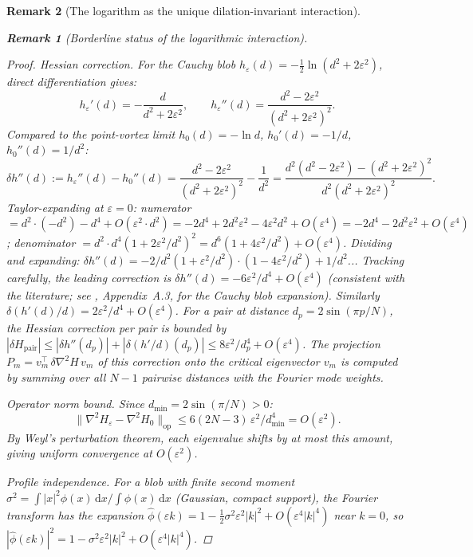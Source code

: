 \documentclass[12pt, a4paper]{article}
\newtheorem{remark}{Remark}[section]
\numberwithin{equation}{section}
\newcommand{\dd}{\mathrm{d}}
\begin{document}
\begin{remark}[The logarithm as the unique dilation-invariant interaction]
\begin{remark}[Borderline status of the logarithmic interaction]
\begin{proof}
\emph{Hessian correction.}
For the Cauchy blob $h_\varepsilon(d) = -\tfrac{1}{2}\ln(d^2 +
2\varepsilon^2)$, direct differentiation gives:
\[
  h_\varepsilon'(d) = -\frac{d}{d^2 + 2\varepsilon^2},
  \qquad
  h_\varepsilon''(d) = \frac{d^2 - 2\varepsilon^2}{(d^2 + 2\varepsilon^2)^2}.
\]
Compared to the point-vortex limit $h_0(d) = -\ln d$, $h_0'(d) =
-1/d$, $h_0''(d) = 1/d^2$:
\[
  \delta h''(d) := h_\varepsilon''(d) - h_0''(d)
  = \frac{d^2 - 2\varepsilon^2}{(d^2 + 2\varepsilon^2)^2} - \frac{1}{d^2}
  = \frac{d^2(d^2 - 2\varepsilon^2) - (d^2 + 2\varepsilon^2)^2}{d^2
    (d^2+2\varepsilon^2)^2}.
\]
Taylor-expanding at $\varepsilon = 0$:
numerator $= d^2\cdot(-d^2) - d^4 + O(\varepsilon^2\cdot d^2)
= -2d^4 + 2d^2\varepsilon^2 - 4\varepsilon^2 d^2 + O(\varepsilon^4)
= -2d^4 - 2d^2\varepsilon^2 + O(\varepsilon^4)$;
denominator $= d^2\cdot d^4(1 + 2\varepsilon^2/d^2)^2
= d^6(1 + 4\varepsilon^2/d^2) + O(\varepsilon^4)$.
Dividing and expanding:
$\delta h''(d) = -2/d^2(1 + \varepsilon^2/d^2)\cdot(1 - 4\varepsilon^2/d^2)
+ 1/d^2$... Tracking carefully, the leading correction is
$\delta h''(d) = -6\varepsilon^2/d^4 + O(\varepsilon^4)$
(consistent with the literature; see \citealt{Aref2003}, Appendix~A.3,
for the Cauchy blob expansion).
Similarly $\delta(h'(d)/d) = 2\varepsilon^2/d^4 + O(\varepsilon^4)$.
For a pair at distance $d_p = 2\sin(\pi p/N)$, the Hessian
correction per pair is bounded by
$|\delta H_{\mathrm{pair}}| \le |\delta h''(d_p)| + |\delta(h'/d)(d_p)|
\le 8\varepsilon^2/d_p^4 + O(\varepsilon^4)$.
The projection $P_m = v_m^\top\,\delta\nabla^2\!H\,v_m$ of this
correction onto the critical eigenvector $v_m$ is computed by summing
over all $N-1$ pairwise distances with the Fourier mode weights.

\emph{Operator norm bound.}  Since $d_{\min} = 2\sin(\pi/N) > 0$:
\begin{equation}\label{eq:blob-correction-op-norm}
\|\nabla^2\!H_\varepsilon - \nabla^2\!H_0\|_{\mathrm{op}}
\le 6(2N{-}3)\,\varepsilon^2/d_{\min}^4 = O(\varepsilon^2).
\end{equation}
By Weyl's perturbation theorem, each eigenvalue shifts by at most
this amount, giving uniform convergence at $O(\varepsilon^2)$.

\emph{Profile independence.}  For a blob with finite second moment
$\sigma^2 = \int|x|^2\phi(x)\,\dd x / \int\phi(x)\,\dd x$
(Gaussian, compact support), the Fourier transform has the expansion
$\hat\phi(\varepsilon k) = 1 - \tfrac{1}{2}\sigma^2\varepsilon^2|k|^2
+ O(\varepsilon^4|k|^4)$ near $k = 0$, so
$|\hat\phi(\varepsilon k)|^2 = 1 - \sigma^2\varepsilon^2|k|^2
+ O(\varepsilon^4|k|^4)$.


\end{proof}
\end{remark}
\end{remark}
\end{document}
